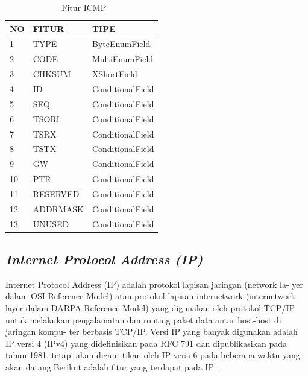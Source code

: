 	 
	 	\begin{table}[H]
	 	\centering
	 	\caption{\ Fitur ICMP}
	 	\label{Fitur ICMP}
	 	\begin{tabular}{|l|l|l|}
	 		\hline
	 		NO & FITUR     & TIPE \\ \hline
	 		1  & TYPE    & ByteEnumField      \\ \hline
	 		2  & CODE & MultiEnumField      \\ \hline
	 		3  & CHKSUM        & XShortField      \\ \hline
	 		4  & ID      & ConditionalField      \\ \hline
	 		5  & SEQ    & ConditionalField      \\ \hline
	 		6  & TSORI & ConditionalField      \\ \hline
	 		7  & TSRX        & ConditionalField      \\ \hline
	 		8  & TSTX      & ConditionalField     \\ \hline
	 		9  & GW    & ConditionalField      \\ \hline
	 		10  & PTR & ConditionalField      \\ \hline
	 		11  & RESERVED        & ConditionalField      \\ \hline
	 		12 & ADDRMASK	&  ConditionalField \\ \hline
	 		13 & UNUSED & ConditionalField \\ \hline
	 	\end{tabular}
	 	\end{table}
 	\newpage
 	\subsection{\emph{Internet Protocol Address (IP)}}
    	Internet Protocol Address (IP) adalah protokol lapisan jaringan (network la-
 	yer dalam OSI Reference Model) atau protokol lapisan internetwork (internetwork
 	layer dalam DARPA Reference Model) yang digunakan oleh protokol TCP/IP untuk
 	melakukan pengalamatan dan routing paket data antar host-host di jaringan kompu-
 	ter berbasis TCP/IP. Versi IP yang banyak digunakan adalah IP versi 4 (IPv4) yang
 	didefinisikan pada RFC 791 dan dipublikasikan pada tahun 1981, tetapi akan digan-
 	tikan oleh IP versi 6 pada beberapa waktu yang akan datang.Berikut adalah fitur yang
 	terdapat pada IP : 
 	

